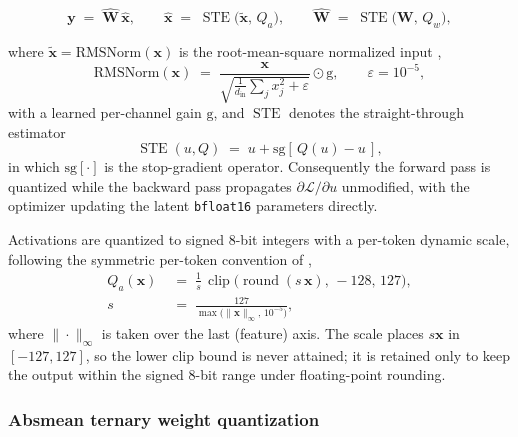\documentclass[final,5p,times,twocolumn]{elsarticle}
\theoremstyle{remark}
\newcommand{\Wm}{\mathbf{W}}
\newcommand{\xv}{\mathbf{x}}
\newcommand{\yv}{\mathbf{y}}
\newcommand{\clip}{\operatorname{clip}}
\newcommand{\round}{\operatorname{round}}
\newcommand{\STE}{\operatorname{STE}}
\begin{document}
\begin{equation}
\label{eq:bitlinear}
\yv \;=\; \widehat{\Wm}\,\hat{\xv}, \qquad
\hat{\xv} \;=\; \STE\!\big(\tilde{\xv},\, Q_{a}\big), \qquad
\widehat{\Wm} \;=\; \STE\!\big(\Wm,\, Q_{w}\big),
\end{equation}

where $\tilde{\xv} = \mathrm{RMSNorm}(\xv)$ is the root-mean-square normalized
input \cite{zhang2019b},
\begin{equation}
\label{eq:rmsnorm}
\mathrm{RMSNorm}(\xv) \;=\;
\frac{\xv}{\sqrt{\tfrac{1}{d_{\mathrm{in}}}\sum_{j} x_{j}^{2} + \varepsilon}}
\odot \boldsymbol{\mathrm{g}},
\qquad \varepsilon = 10^{-5},
\end{equation}
with a learned per-channel gain $\boldsymbol{\mathrm{g}}$, and $\STE$ denotes
the straight-through estimator \cite{bengio2013}
\begin{equation}
\label{eq:ste}
\STE(u, Q) \;=\; u + \mathrm{sg}\!\left[\,Q(u) - u\,\right],
\end{equation}
in which $\mathrm{sg}[\cdot]$ is the stop-gradient operator. Consequently the
forward pass is quantized while the backward pass propagates
$\partial \mathcal{L}/\partial u$ unmodified, with the optimizer updating the
latent \texttt{bfloat16} parameters directly.

Activations are quantized to signed 8-bit integers with a per-token dynamic
scale, following the symmetric per-token convention of
\cite{wang2023,ma2024},
\begin{equation}
\label{eq:actquant}
\begin{aligned}
Q_{a}(\xv) &\;=\; \frac{1}{s}\,
\clip\!\big(\round(s\,\xv),\,-128,\,127\big),\\[0.4ex]
s &\;=\; \frac{127}{\max\big(\|\xv\|_{\infty},\,10^{-5}\big)},
\end{aligned}
\end{equation}
where $\|\cdot\|_{\infty}$ is taken over the last (feature) axis. The scale
places $s\xv$ in $[-127,127]$, so the lower clip bound is never attained; it
is retained only to keep the output within the signed 8-bit range under
floating-point rounding.

\subsubsection{Absmean ternary weight quantization}
\end{document}
